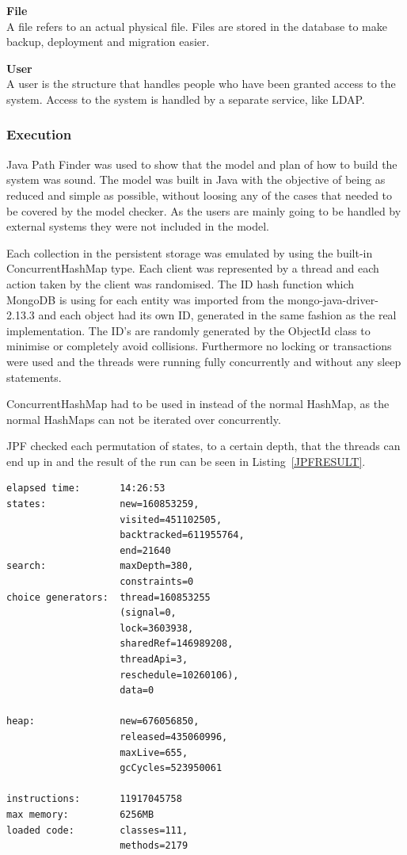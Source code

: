 \documentclass[a4paper,12pt]{article}
\begin{document}
\par \textbf{File} \\
A file refers to an actual physical file. Files are stored in the database to make backup,
deployment and migration easier.\\

\par \textbf{User} \\
A user is the structure that handles people who have been granted access to the system. Access to
the system is handled by a separate service, like LDAP.\\

\subsubsection{Execution}
Java Path Finder was used to show that the model and plan of how to build the system was sound. The
model was built in Java with the objective of being as reduced and simple as possible, without
loosing any of the cases that needed to be covered by the model checker. As the users are mainly
going to be handled by external systems they were not included in the model.

Each collection in the persistent storage was emulated by using the built-in ConcurrentHashMap type.
Each client was represented by a thread and each action taken by the client was randomised. The ID
hash function which MongoDB is using for each entity was imported from the mongo-java-driver-2.13.3
and each object had its own ID, generated in the same fashion as the real implementation. The ID's
are randomly generated by the ObjectId class to minimise or completely avoid collisions.
Furthermore no locking or transactions were used and the threads were running fully concurrently and
without any sleep statements. 

ConcurrentHashMap had to be used in instead of the normal HashMap, as the normal HashMaps can not 
be iterated over concurrently.

JPF checked each permutation of states, to a certain depth, that the threads can end up in and the 
result of the run can be seen in Listing~\ref{JPFRESULT}.

\begin{lstlisting}[label=JPFRESULT,caption=Results of JPF run]
elapsed time:       14:26:53
states:             new=160853259,
                    visited=451102505,
                    backtracked=611955764,
                    end=21640
search:             maxDepth=380,
                    constraints=0
choice generators:  thread=160853255 
                    (signal=0,
                    lock=3603938,
                    sharedRef=146989208,
                    threadApi=3,
                    reschedule=10260106), 
                    data=0

heap:               new=676056850,
                    released=435060996,
                    maxLive=655,
                    gcCycles=523950061

instructions:       11917045758
max memory:         6256MB
loaded code:        classes=111,
                    methods=2179
\end{lstlisting}
\end{document}
